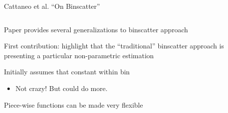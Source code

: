 \documentclass[notes,11pt, aspectratio=169]{beamer}
\newenvironment{wideitemize}{\itemize\addtolength{\itemsep}{10pt}}{\enditemize}
\begin{document}
\begin{frame}{Cattaneo et al. ``On Binscatter''}
  \begin{columns}[T] %
    \begin{column}{.5\textwidth}
      \begin{wideitemize}
      \item Paper provides several generalizations to binscatter approach
      \item First contribution: highlight that the ``traditional''
        binscatter approach is presenting a particular non-parametric
        estimation
      \item Initially assumes that constant within bin
        \begin{itemize}
        \item Not crazy! But could do more. 
        \end{itemize}
      \item Piece-wise functions can be made very flexible
  \end{wideitemize}
  \end{column}%
  \hfill%
  \begin{column}{.5\textwidth}
\end{column}
\end{columns}
\end{frame}
\end{document}
